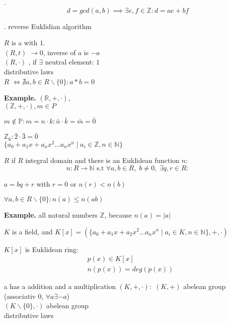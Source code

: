 \Theorem.
\[
  d = gcd(a,b) \implies \exists e,f \in \mathbb{Z}: d = ae + bf
\]

\Proof.
reverse Euklidian algorithm

\begin{definition}
$R$ is a  with $1$. \\
$(R,t)$  $\rightarrow 0$, inverse of $a$ is $-a$\\
$(R,\cdot)$ , if $\exists$ neutral element: $1$ \\
distributive laws\\
$R$  $\iff \nexists a,b \in R \backslash \{0\}: a*b = 0$
\end{definition}

\textbf{Example.}
$(\mathbb{R}, +, \cdot)$, \\
$(\mathbb{Z}, + , \cdot), m \in P$

$m\not\in \mathbb{P}: m = n \cdot k : \bar{n} \cdot \bar{k} = \bar{m} = \bar{0}$

$\mathbb{Z}_6 : \bar{2} \cdot \bar{3} = \bar{0}$ \\
$\{a_0 + a_1 x + a_x x^2 \ldots a_n x^n \mid a_i \in \mathbb{Z}, n \in \mathbb{N} \}$

\begin{definition}
$R$  if $R$ integral domain and there is an Euklidean function $n$:
\[
  n : R \rightarrow \mathbb{N} \text{ s.t } \forall a,b \in R,\; b \neq 0,\; \exists q,r \in R:
\]

\begin{compactenum}
\item $a = bq + r$ with $r = 0$ or $n(r) < n(b)$
\item $\forall a,b \in R \backslash \{0\} : n(a) \leq n(ab)$
\end{compactenum}
\end{definition}

\textbf{Example.}
all natural numbers $\mathbb{Z}$, because $n(a) = |a|$

$K$ is a field, and $K[x] = 
\left(\{a_0 + a_1 x + a_2 x^2 \ldots a_n x^n \mid a_i \in K, n \in \mathbb{N} \}
,+, \cdot \right)$

$K[x]$ is Euklidean ring:
\begin{align*}
  &p(x) \in K[x] \\
  &n(p(x)) = deg(p(x))
\end{align*}

\begin{definition}
a  has a addition and a multiplication
$(K, +, \cdot):$ 
  $(K,+)$ abelean group (associativ 0, $\forall a \exists -a$) \\
  $(K \backslash \{0\}, \cdot)$ abelean group \\
  distributive laws
\end{definition}

